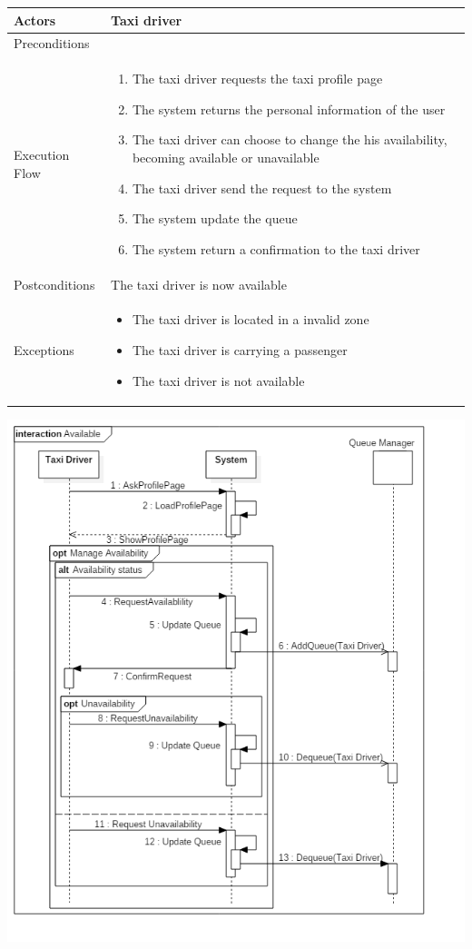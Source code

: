 \documentclass[english]{article}
\providecommand{\tabularnewline}{\\}
\begin{document}
\begin{tabular}{lp{8cm}}
\hline 
Actors  & Taxi driver \tabularnewline
\hline 
Preconditions  & \tabularnewline
\hline 
Execution Flow  & \begin{enumerate}
\item The taxi driver requests the taxi profile page 
\item The system returns the personal information of the user
\item The taxi driver can choose to change the his availability, becoming available or unavailable
\item The taxi driver send the request to the system
\item The system update the queue
\item The system return a confirmation to the taxi driver
\end{enumerate}
\tabularnewline
\hline 
Postconditions  & The taxi driver is now available \tabularnewline
\hline 
Exceptions  & \begin{itemize}
\item The taxi driver is located in a invalid zone 
\item The taxi driver is carrying a passenger 
\item The taxi driver is not available\end{itemize}
\tabularnewline
\end{tabular}

\includegraphics[width=\textwidth]{Available}
\end{document}
